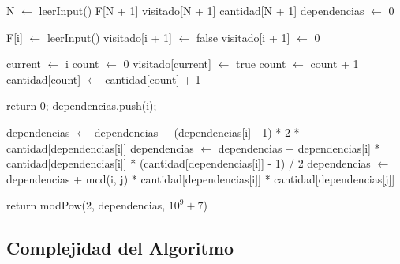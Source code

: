 	\begin{algorithmic}
		\State N $\gets$ leerInput()
		\State F[N + 1]
		\State visitado[N + 1]
		\State cantidad[N + 1]
		\State dependencias $\gets$ 0

			\State F[i] $\gets$ leerInput()
			\State visitado[i + 1] $\gets$ false
			\State visitado[i + 1] $\gets$ 0
		\EndFor

			\State current $\gets$ i
			\State count $\gets$ 0
				\State visitado[current] $\gets$ true
				\State count $\gets$ count + 1
			\EndWhile
			\State cantidad[count] $\gets$ cantidad[count] + 1
		\EndFor

				\State return 0;
			\EndIf
				\State dependencias.push(i);
			\EndIf
		\EndFor

			\State dependencias $\gets$ dependencias + (dependencias[i] - 1) * 2 * cantidad[dependencias[i]]
			\State dependencias $\gets$ dependencias + dependencias[i] * cantidad[dependencias[i]] * (cantidad[dependencias[i]] - 1) / 2
				\State dependencias $\gets$ dependencias + mcd(i, j) * cantidad[dependencias[i]] * cantidad[dependencias[j]]
			\EndFor
		\EndFor

		\State return modPow(2, dependencias, $10^9 + 7$)

	\end{algorithmic}


\subsection{Complejidad del Algoritmo}	